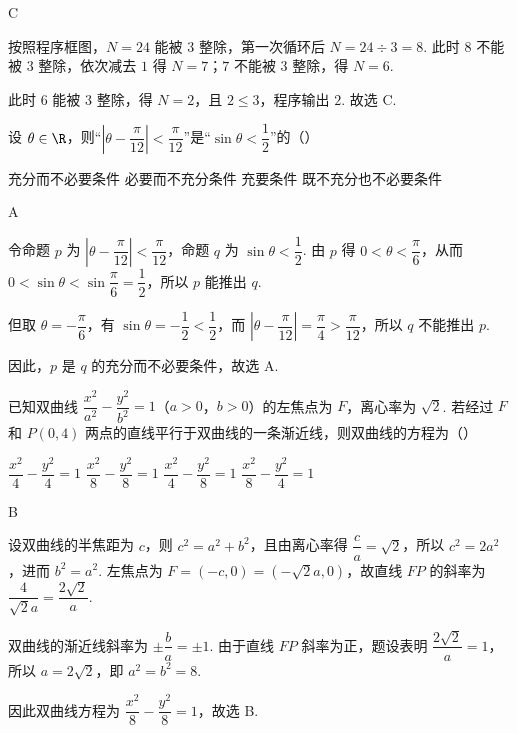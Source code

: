 \begin{answer}
C
\end{answer}

\begin{solution}
按照程序框图，\(N=24\) 能被 \(3\) 整除，第一次循环后 \(N=24\div 3=8\). 此时 \(8\) 不能被 \(3\) 整除，依次减去 \(1\) 得 \(N=7\)；\(7\) 不能被 \(3\) 整除，得 \(N=6\).

此时 \(6\) 能被 \(3\) 整除，得 \(N=2\)，且 \(2\leq 3\)，程序输出 \(2\). 故选 C.
\end{solution}

\begin{problem}
设 \(\theta\in\R\)，则“\(\left|\theta-\dfrac{\pi}{12}\right|<\dfrac{\pi}{12}\)”是“\(\sin\theta<\dfrac12\)”的（\quad）

\choices
    {充分而不必要条件}
    {必要而不充分条件}
    {充要条件}
    {既不充分也不必要条件}
\end{problem}

\begin{answer}
A
\end{answer}

\begin{solution}
令命题 \(p\) 为 \(\left|\theta-\dfrac{\pi}{12}\right|<\dfrac{\pi}{12}\)，命题 \(q\) 为 \(\sin\theta<\dfrac12\). 由 \(p\) 得
\(0<\theta<\dfrac{\pi}{6}\)，从而 \(0<\sin\theta<\sin\dfrac{\pi}{6}=\dfrac12\)，所以 \(p\) 能推出 \(q\).

但取 \(\theta=-\dfrac{\pi}{6}\)，有 \(\sin\theta=-\dfrac12<\dfrac12\)，而
\(\left|\theta-\dfrac{\pi}{12}\right|=\dfrac{\pi}{4}>\dfrac{\pi}{12}\)，所以 \(q\) 不能推出 \(p\).

因此，\(p\) 是 \(q\) 的充分而不必要条件，故选 A.
\end{solution}

\begin{problem}
已知双曲线 \(\dfrac{x^2}{a^2}-\dfrac{y^2}{b^2}=1\)（\(a>0\)，\(b>0\)）的左焦点为 \(F\)，离心率为 \(\sqrt{2}\). 若经过 \(F\) 和 \(P(0,4)\) 两点的直线平行于双曲线的一条渐近线，则双曲线的方程为（\quad）

\choices
    {\(\dfrac{x^2}{4}-\dfrac{y^2}{4}=1\)}
    {\(\dfrac{x^2}{8}-\dfrac{y^2}{8}=1\)}
    {\(\dfrac{x^2}{4}-\dfrac{y^2}{8}=1\)}
    {\(\dfrac{x^2}{8}-\dfrac{y^2}{4}=1\)}
\end{problem}

\begin{answer}
B
\end{answer}

\begin{solution}
设双曲线的半焦距为 \(c\)，则 \(c^2=a^2+b^2\)，且由离心率得
\(\dfrac ca=\sqrt2\)，所以 \(c^2=2a^2\)，进而 \(b^2=a^2\). 左焦点为
\(F=(-c,0)=(-\sqrt2a,0)\)，故直线 \(FP\) 的斜率为
\(\dfrac{4}{\sqrt2a}=\dfrac{2\sqrt2}{a}\).

双曲线的渐近线斜率为 \(\pm\dfrac ba=\pm1\). 由于直线 \(FP\) 斜率为正，题设表明
\(\dfrac{2\sqrt2}{a}=1\)，所以 \(a=2\sqrt2\)，即 \(a^2=b^2=8\).

因此双曲线方程为 \(\dfrac{x^2}{8}-\dfrac{y^2}{8}=1\)，故选 B.
\end{solution}

